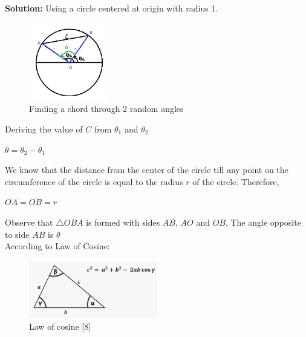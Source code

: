 \documentclass[answers]{exam}
\begin{document}
\begin{framed}
\textbf{Solution:}
Using a circle centered at origin with radius 1. 
\begin{figure}[H] %
    \centering
    \includegraphics[width= 0.3\textwidth]{Q4.1_working.PNG}
    \caption{Finding a chord through 2 random angles}
\end{figure}

Deriving the value of $C$ from $\theta_1$ and $\theta_2$\\
\begin{center}
    $\theta = \theta_2 - \theta_1$
\end{center}

We know that the distance from the center of the circle till any point on the circumference of the circle is equal to the radius $r$ of the circle. Therefore, 

\begin{center}
    $\overline{OA} = \overline{OB} = r$
\end{center}

Observe that $\triangle OBA$ is formed with sides $AB$, $AO$ and $OB$, The angle opposite to side $AB$ is $\theta$\\
According to Law of Cosine: \\

\begin{figure}[H] %
    \centering
    \includegraphics[width= 0.5\textwidth]{cosine_law.PNG}
    \caption{Law of cosine [8] }
\end{figure}


\end{framed}
\end{document}
